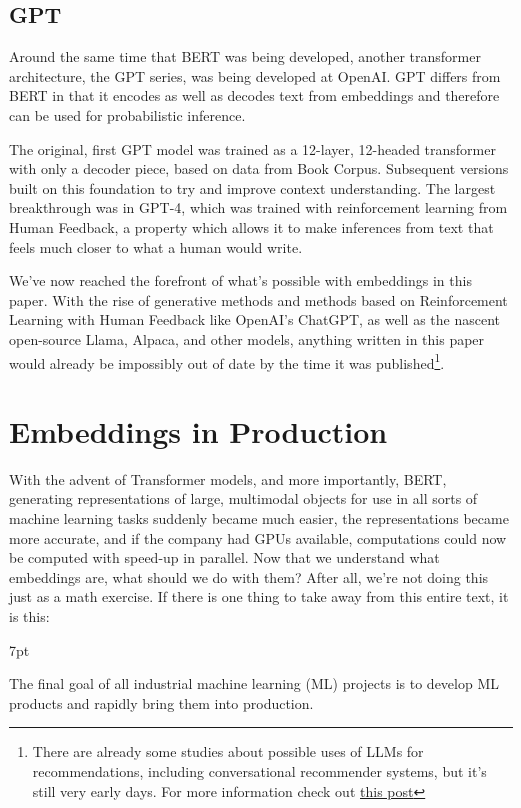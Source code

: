 \documentclass[11pt, table]{diazessay} %
\newenvironment{formal}{%
  \def\FrameCommand{%
	\hspace{1pt}%
	{\color{w_lightblue}\vrule width 2pt}%
	{\color{formalshade}\vrule width 4pt}%
	\colorbox{formalshade}%
  }%
  \MakeFramed{\advance\hsize-\width\FrameRestore}%
  \noindent\hspace{-4.55pt}%
  \begin{adjustwidth}{}{7pt}%
  \vspace{2pt}\vspace{2pt}%
}
{%
  \vspace{2pt}\end{adjustwidth}\endMakeFramed%
}
\begin{document}
\begin{sloppypar}
\subsection{GPT}
Around the same time that BERT was being developed, another transformer architecture, the GPT series, was being developed at OpenAI. GPT differs from BERT in that it encodes as well as decodes text from embeddings and therefore can be used for probabilistic inference.

The original, first GPT model was trained as a 12-layer, 12-headed transformer with only a decoder piece, based on data from Book Corpus. Subsequent versions built on this foundation to try and improve context understanding. The largest breakthrough was in GPT-4, which was trained with reinforcement learning from Human Feedback, a property which allows it to make inferences from text that feels much closer to what a human would write.

We've now reached the forefront of what's possible with embeddings in this paper. With the rise of generative methods and methods based on Reinforcement Learning with Human Feedback like OpenAI's ChatGPT, as well as the nascent open-source Llama, Alpaca, and other models,  anything written in this paper would already be impossibly out of date by the time it was published\footnote{There are already some studies about possible uses of LLMs for recommendations, including conversational recommender systems, but it's still very early days. For more information check out \href{https://blog.reachsumit.com/posts/2023/05/tuning-llm-for-recsys/}{this post}}.

\section{Embeddings in Production}

With the advent of Transformer models, and more importantly, BERT, generating representations of large, multimodal objects for use in all sorts of machine learning tasks suddenly became much easier, the representations became more accurate, and if the company had GPUs available, computations could now be computed with speed-up in parallel. Now that we understand what embeddings are, what should we do with them? After all, we're not doing this just as a math exercise. If there is one thing to take away from this entire text, it is this:

\begin{formal}
The final goal of all industrial machine learning (ML) projects is to develop ML products and rapidly bring them into production. \citep{kreuzberger2022machine}
\end{formal}


\end{sloppypar}
\end{document}
